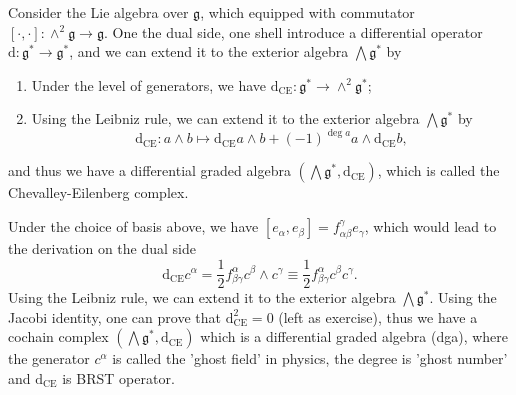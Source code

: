 \documentclass[10pt]{article}
\begin{document}
Consider the Lie algebra over $ \mathfrak{g}$, which equipped with commutator $[\cdot, \cdot] : \wedge^{2} \mathfrak{g} \rightarrow \mathfrak{g}$. One the dual side, one shell introduce a differential operator $ \mathrm{d} : \mathfrak{g}^{*} \rightarrow \mathfrak{g}^{*}$, and we can extend it to the exterior algebra $ \bigwedge \mathfrak{g}^{*}$ by
\begin{enumerate}[(1)]
  \item Under the level of generators, we have $ \mathrm{d} _{\mathrm{CE}} : \mathfrak{g}^{*} \rightarrow \wedge^{2} \mathfrak{g}^{*}$;
  \item Using the Leibniz rule, we can extend it to the exterior algebra $ \bigwedge \mathfrak{g}^{*}$ by
    \begin{equation*}
      \mathrm{d} _{\mathrm{CE}} : a \wedge b \mapsto \mathrm{d} _{\mathrm{CE}} a \wedge b + (-1)^{\deg a} a \wedge \mathrm{d} _{\mathrm{CE}} b,
    \end{equation*}
\end{enumerate}
and thus we have a differential graded algebra $ \left( \bigwedge \mathfrak{g}^{*}, \mathrm{d} _{\mathrm{CE}} \right)$, which is called the Chevalley-Eilenberg complex.

Under the choice of basis above, we have $[e_{\alpha} , e_{\beta}] = f^{\gamma}_{\alpha \beta} e_{\gamma}$, which would lead to the derivation on the dual side
\begin{equation*}
  \mathrm{d} _{\mathrm{CE}} c^{\alpha} = \frac{1}{2} f^{\alpha}_{\beta \gamma} c^{\beta} \wedge c^{\gamma} \equiv \frac{1}{2}f^{\alpha}_{\beta \gamma} c^{\beta}c^{\gamma}.
\end{equation*}
Using the Leibniz rule, we can extend it to the exterior algebra $ \bigwedge \mathfrak{g}^{*}$. Using the Jacobi identity, one can prove that $ \mathrm{d} _{\mathrm{CE}}^{2} = 0$ (left as exercise), thus we have a cochain complex $\left( \bigwedge \mathfrak{g}^{*}, \mathrm{d} _{\mathrm{CE}} \right)$ which is a differential graded algebra (dga),
where the generator $ c^{\alpha} $ is called the 'ghost field' in physics, the degree is 'ghost number' and $ \mathrm{d} _{\mathrm{CE}}$ is BRST operator.
\end{document}
